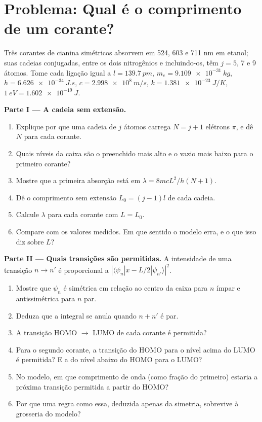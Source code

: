 \section{Problema: Qual é o comprimento de um corante?}

\begin{problem}
\label{pb:b3:quantum-model-systems:1}
Três corantes de cianina simétricos absorvem em 524, 603 e 711 nm em etanol;
suas cadeias conjugadas, entre os dois nitrogênios e incluindo-os, têm $j = 5$, 7
e 9 átomos. Tome cada ligação igual a $l = \qty{139.7}{pm}$, $m_e =
\qty{9.109e-31}{kg}$, $h = \qty{6.626e-34}{J.s}$, $c = \qty{2.998e8}{m/s}$,
$k = \qty{1.381e-23}{J/K}$, $\qty{1}{eV} = \qty{1.602e-19}{J}$.

\medskip\noindent\textbf{Parte I --- A cadeia sem extensão.}
\begin{enumerate}
  \item Explique por que uma cadeia de $j$ átomos carrega $N = j + 1$ elétrons $\pi$, e
        dê $N$ para cada corante.
  \item Quais níveis da caixa são o preenchido mais alto e o vazio mais baixo
        para o primeiro corante?
  \item Mostre que a primeira absorção está em $\lambda = 8mcL^2/h(N+1)$.
  \item Dê o comprimento sem extensão $L_0 = (j - 1)l$ de cada cadeia.
  \item Calcule $\lambda$ para cada corante com $L = L_0$.
  \item Compare com os valores medidos. Em que sentido o modelo erra, e o
        que isso diz sobre $L$?
\end{enumerate}

\medskip\noindent\textbf{Parte II --- Quais transições são permitidas.}
A intensidade de uma transição $n \to n'$ é proporcional a $|\langle
\psi_n|x - L/2|\psi_{n'}\rangle|^2$.
\begin{enumerate}[resume]
  \item Mostre que $\psi_n$ é simétrica em relação ao centro da caixa para $n$
        ímpar e antissimétrica para $n$ par.
  \item Deduza que a integral se anula quando $n + n'$ é par.
  \item A transição HOMO $\to$ LUMO de cada corante é permitida?
  \item Para o segundo corante, a transição do HOMO para o nível acima do
        LUMO é permitida? E a do nível abaixo do HOMO para o LUMO?
  \item No modelo, em que comprimento de onda (como fração do primeiro)
        estaria a próxima transição permitida a partir do HOMO?
  \item Por que uma regra como essa, deduzida apenas da simetria, sobrevive
        à grosseria do modelo?
\end{enumerate}


\end{problem}
